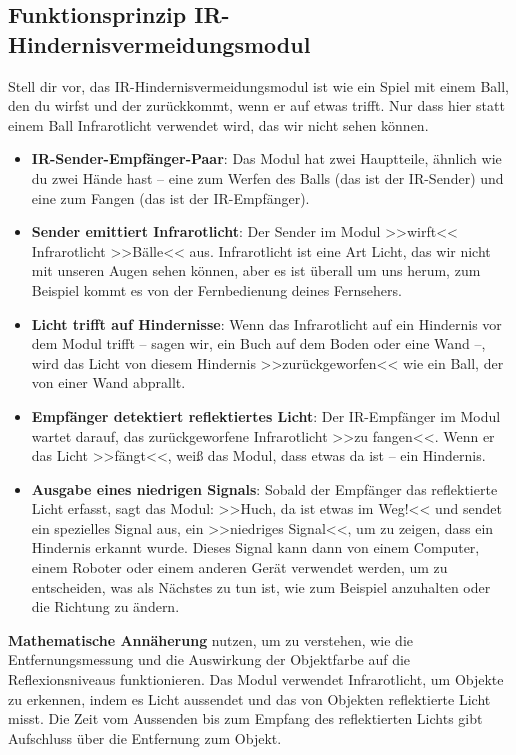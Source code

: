 \documentclass{vorlage-design-main}
\begin{document}
\hypertarget{funktionsprinzip-ir-hindernisvermeidungsmodul}{%
\subsection{Funktionsprinzip
IR-Hindernisvermeidungsmodul}\label{funktionsprinzip-ir-hindernisvermeidungsmodul}}

Stell dir vor, das IR-Hindernisvermeidungsmodul ist wie ein Spiel mit
einem Ball, den du wirfst und der zurückkommt, wenn er auf etwas trifft.
Nur dass hier statt einem Ball Infrarotlicht verwendet wird, das wir
nicht sehen können.

\begin{itemize}
\item
  \textbf{IR-Sender-Empfänger-Paar}: Das Modul hat zwei Hauptteile,
  ähnlich wie du zwei Hände hast -- eine zum Werfen des Balls (das ist
  der IR-Sender) und eine zum Fangen (das ist der IR-Empfänger).
\item
  \textbf{Sender emittiert Infrarotlicht}: Der Sender im Modul >>wirft<<
  Infrarotlicht >>Bälle<< aus. Infrarotlicht ist eine Art Licht, das wir
  nicht mit unseren Augen sehen können, aber es ist überall um uns
  herum, zum Beispiel kommt es von der Fernbedienung deines Fernsehers.
\item
  \textbf{Licht trifft auf Hindernisse}: Wenn das Infrarotlicht auf ein
  Hindernis vor dem Modul trifft -- sagen wir, ein Buch auf dem Boden
  oder eine Wand --, wird das Licht von diesem Hindernis
  >>zurückgeworfen<< wie ein Ball, der von einer Wand abprallt.
\item
  \textbf{Empfänger detektiert reflektiertes Licht}: Der IR-Empfänger im
  Modul wartet darauf, das zurückgeworfene Infrarotlicht >>zu fangen<<.
  Wenn er das Licht >>fängt<<, weiß das Modul, dass etwas da ist -- ein
  Hindernis.
\item
  \textbf{Ausgabe eines niedrigen Signals}: Sobald der Empfänger das
  reflektierte Licht erfasst, sagt das Modul: >>Huch, da ist etwas im
  Weg!<< und sendet ein spezielles Signal aus, ein >>niedriges Signal<<,
  um zu zeigen, dass ein Hindernis erkannt wurde. Dieses Signal kann
  dann von einem Computer, einem Roboter oder einem anderen Gerät
  verwendet werden, um zu entscheiden, was als Nächstes zu tun ist, wie
  zum Beispiel anzuhalten oder die Richtung zu ändern.
\end{itemize}

\textbf{Mathematische Annäherung} nutzen, um zu verstehen, wie die
Entfernungsmessung und die Auswirkung der Objektfarbe auf die
Reflexionsniveaus funktionieren. Das Modul verwendet Infrarotlicht, um
Objekte zu erkennen, indem es Licht aussendet und das von Objekten
reflektierte Licht misst. Die Zeit vom Aussenden bis zum Empfang des
reflektierten Lichts gibt Aufschluss über die Entfernung zum Objekt.
\end{document}
